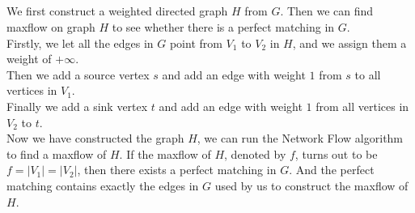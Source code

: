 \documentclass[12pt,letterpaper]{article}
\begin{document}
\subsection{}
We first construct a weighted directed graph $H$ from $G$.
Then we can find maxflow on graph $H$ to see whether there is a perfect matching in $G$.\\
Firstly, we let all the edges in $G$ point from $V_1$ to $V_2$ in $H$,
and we assign them a weight of $+\infty$.\\
Then we add a source vertex $s$ and 
add an edge with weight $1$ from $s$ to all vertices in $V_1$.\\
Finally we add a sink vertex $t$ and 
add an edge with weight $1$ from all vertices in $V_2$ to $t$.\\
Now we have constructed the graph $H$,
we can run the Network Flow algorithm to find a maxflow of $H$.
If the maxflow of $H$, denoted by $f$,
turns out to be $f=|V_1|=|V_2|$,
then there exists a perfect matching in $G$.
And the perfect matching contains exactly the edges in $G$ used 
by us to construct the maxflow of $H$.
\end{document}
